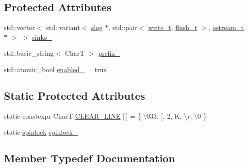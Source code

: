 \subsection*{Protected Attributes}
\begin{DoxyCompactItemize}
\item 
std\+::vector$<$ std\+::variant$<$ \hyperlink{structdevfix_1_1base_1_1slog}{slog} $\ast$, std\+::pair$<$ \hyperlink{structdevfix_1_1base_1_1slog_a5897ebe6b65ffd7a1845a6bca989f288}{write\+\_\+t}, \hyperlink{structdevfix_1_1base_1_1slog_a5c957ca5d7392786ede9f813ec40fb40}{flush\+\_\+t} $>$, \hyperlink{structdevfix_1_1base_1_1slog_a3602226e6adc9ea19626e25a0df085a6}{ostream\+\_\+t} $\ast$ $>$ $>$ \hyperlink{structdevfix_1_1base_1_1slog_ad2da16c81e93026a8094c53c2261cb33}{sinks\+\_\+}
\item 
std\+::basic\+\_\+string$<$ CharT $>$ \hyperlink{structdevfix_1_1base_1_1slog_a32d647fa732679ecb1fe679f1305f43a}{prefix\+\_\+}
\item 
std\+::atomic\+\_\+bool \hyperlink{structdevfix_1_1base_1_1slog_a5376d7ddd91f95c9d7fcb8629fcfcdf0}{enabled\+\_\+} = true
\end{DoxyCompactItemize}
\subsection*{Static Protected Attributes}
\begin{DoxyCompactItemize}
\item 
static constexpr CharT \hyperlink{structdevfix_1_1base_1_1slog_aa308e2dc79a5ef8ad14db038232b0fe3}{C\+L\+E\+A\+R\+\_\+\+L\+I\+NE} \mbox{[}$\,$\mbox{]} = \{ \textquotesingle{}\textbackslash{}033\textquotesingle{}, \textquotesingle{}\mbox{[}\textquotesingle{}, \textquotesingle{}2\textquotesingle{}, \textquotesingle{}K\textquotesingle{}, \textquotesingle{}\textbackslash{}r\textquotesingle{}, \textquotesingle{}\textbackslash{}0\textquotesingle{} \}
\item 
static \hyperlink{structdevfix_1_1base_1_1spinlock}{spinlock} \hyperlink{structdevfix_1_1base_1_1slog_a6bfea192aed809edbca0deacdce5b8df}{spinlock\+\_\+}
\end{DoxyCompactItemize}


\subsection{Member Typedef Documentation}
\mbox{\label{structdevfix_1_1base_1_1slog_a5c957ca5d7392786ede9f813ec40fb40}} 
